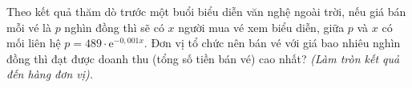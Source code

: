 \begin{ex}%
	Theo kết quả thăm dò trước một buổi biểu diễn văn nghệ ngoài trời, nếu giá bán mỗi vé là $p$ nghìn đồng thì sẽ có $x$ người mua vé xem biểu diễn, giữa $p$ và $x$ có mối liên hệ $p=489\cdot \mathrm{e}^{-0{,}001x}$. Đơn vị tổ chức nên bán vé với giá bao nhiêu nghìn đồng thì đạt được doanh thu (tổng số tiền bán vé) cao nhất?\textit{ (Làm tròn kết quả đến hàng đơn vị).}
\end{ex}

